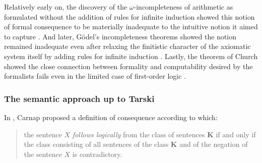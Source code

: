 \documentclass[]{article}
\begin{document}
Relatively early on, the discovery of the $\omega$-incompleteness of arithmetic as formulated without the addition of rules for infinite induction showed this notion of formal consequence to be materially inadequate to the intuitive notion it aimed to capture \cite[177-178]{Tarski2002}. And later, G\"{o}del's incompleteness theorems showed the notion remained inadequate even after relaxing the finitistic character of the axiomatic system itself by adding rules for infinite induction \cite{Godel1931} \cite[179-181]{Tarski2002}. Lastly, the theorem of Church showed the close connection between formality and computability desired by the formalists \cite[321-325]{DutilhNovaes2011} fails even in the limited case of first-order logic \cite{Church1936}.

\subsubsection{The semantic approach up to Tarski}
In \cite{Carnap1934}, Carnap proposed a definition of consequence according to which: 
\begin{quote}the sentence $X$ \textit{follows logically} from the class of sentences $\textbf{K}$ if and only if the class consisting of all sentences of the class $\textbf{K}$ and of the negation of the sentence $X$ is contradictory.\end{quote}
\end{document}
